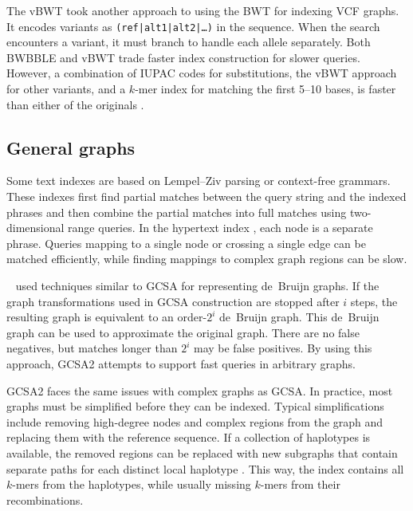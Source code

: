 The vBWT \cite{Maciuca_2016} took another approach to using the BWT for indexing VCF graphs.
It encodes variants as \texttt{(ref|alt1|alt2|\dots)} in the sequence.
When the search encounters a variant, it must branch to handle each allele separately.
Both BWBBLE and vBWT trade faster index construction for slower queries.
However, a combination of IUPAC codes for substitutions, the vBWT approach for other variants, and a $k$-mer index for matching the first 5--10 bases, is faster than either of the originals \cite{Buechler_2019}.

\subsection{General graphs}

Some text indexes are based on Lempel--Ziv parsing or context-free grammars.
These indexes first find partial matches between the query string and the indexed phrases and then combine the partial matches into full matches using two-dimensional range queries.
In the hypertext index \cite{Thachuk_2013}, each node is a separate phrase.
Queries mapping to a single node or crossing a single edge can be matched efficiently, while finding mappings to complex graph regions can be slow.

\citeauthor{Bowe_2012}\ \cite{Bowe_2012} used techniques similar to GCSA for representing de~Bruijn graphs.
If the graph transformations used in GCSA construction are stopped after $i$ steps, the resulting graph is equivalent to an order-$2^{i}$ de~Bruijn graph.
This de~Bruijn graph can be used to approximate the original graph.
There are no false negatives, but matches longer than $2^{i}$ may be false positives.
By using this approach, GCSA2 \cite{Siren_2017} attempts to support fast queries in arbitrary graphs.

GCSA2 faces the same issues with complex graphs as GCSA.
In practice, most graphs must be simplified before they can be indexed.
Typical simplifications include removing high-degree nodes and complex regions from the graph and replacing them with the reference sequence.
If a collection of haplotypes is available, the removed regions can be replaced with new subgraphs that contain separate paths for each distinct local haplotype \cite{Siren_2019}.
This way, the index contains all $k$-mers from the haplotypes, while usually missing $k$-mers from their recombinations.

